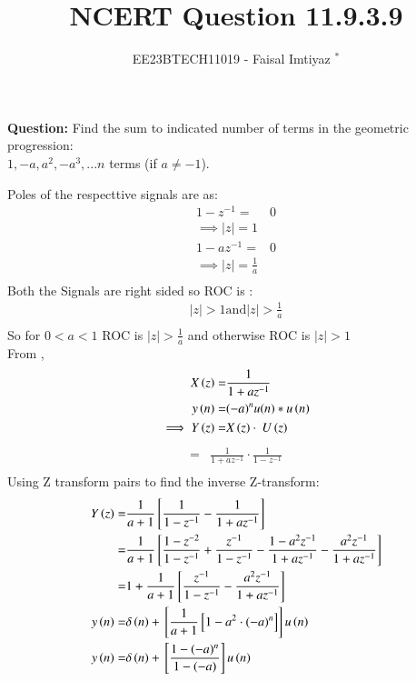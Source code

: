 \documentclass[journal,12pt,twocolumn]{IEEEtran}
\theoremstyle{remark}
\begin{document}

\vspace{3cm}
\title{NCERT Question 11.9.3.9}
\author{EE23BTECH11019 - Faisal Imtiyaz $^{*}$%
}
\maketitle
\newpage
\bigskip

\renewcommand{\thefigure}{\arabic{figure}}
\renewcommand{\thetable}{\arabic{table}}


\vspace{3cm}
\textbf{Question:} Find the sum to indicated number of terms in the geometric progression:\\
$1,-a, a^2, -a^3,...n$ terms (if $a\neq-1$).\\
\solution


Poles of the respecttive signals are as:
\begin{align}
    1-z^{-1} =& 0\\ 
    \implies  |z|  =1\\
    1-az^{-1} =& 0\\
    \implies |z| = \frac{1}{a}\\
\end{align}
Both the Signals are right sided so ROC is :
\begin{align}
    |z| > 1 \text{and} |z| > \frac{1}{a}\\
\end{align}
So for $0<a<1$ ROC is $|z| > \frac{1}{a}$ and otherwise ROC is $|z| > 1$\\
From ,
\begin{align}
X\left(z\right) =& \frac{1}{1+az^{-1}}\\
y\left(n\right)= &{(-a)^n}u(n)*u\left(n\right)\\
\implies Y\left(z\right)= &X\left(z\right)\cdot\ U\left(z\right)
\end{align}
\begin{align}
    = &\frac{1}{1+az^{-1}}\cdot\frac{1}{1-z^{-1}}\\
\end{align}
Using Z transform pairs  to find the inverse Z-transform:\\
\begin{align}
    Y\left(z\right)=& \frac{1}{a+1}{}\left[\frac{1}{1-z^{-1}} - \frac{1}{1+az^{-1}}\right]\\
    =& \frac{1}{a+1}{}\left[\frac{1-z^{-2}}{1-z^{-1}}+\frac{z^{-1}}{1-z^{-1}} -\frac{{1}-a^{2}z^{-1}}{1+az^{-1}} -\frac{a^{2}z^{-1}}{1+az^{-1}}\right]\\
    =& 1+\frac{1}{a+1}{}\left[\frac{z^{-1}}{1-z^{-1}}-\frac{a^{2}z^{-1}}{1+az^{-1}}\right]\\
    y\left(n\right) =& \delta\left(n\right) + {}\left[\frac{1}{a+1}{}\left[1- a^{2}\cdot(-a)^{n}\right]\right]u\left(n\right)\\
    y\left(n\right) =& \delta\left(n\right)+ {}\left[\frac{1-(-a)^{n}}{1-(-a)}\right]u\left(n\right)
\end{align}
\end{document}
